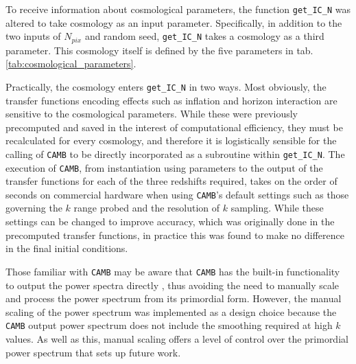 \documentclass[floats,floatfix,showpacs,amssymb,prd,superscriptaddress,nofootinbib]{revtex4-2} %
\newcommand{\code}{\texttt}
\newcommand{\red}{\textcolor{red}}
\begin{document}

To receive information about cosmological parameters, the function \code{get\_IC\_N} was altered to take cosmology as an input parameter. Specifically, in addition to the two inputs of $N_{pix}$ and random seed, \code{get\_IC\_N} takes a cosmology as a third parameter. This cosmology itself is defined by the five parameters in tab. \ref{tab:cosmological_parameters}.

Practically, the cosmology enters \code{get\_IC\_N} in two ways. Most obviously, the transfer functions encoding effects such as inflation and horizon interaction are sensitive to the cosmological parameters. While these were previously precomputed and saved in the interest of computational efficiency, they must be recalculated for every cosmology, and therefore it is logistically sensible for the calling of \code{CAMB} to be directly incorporated as a subroutine within \code{get\_IC\_N}. The execution of \code{CAMB}, from instantiation using parameters to the output of the transfer functions for each of the three redshifts required, takes on the order of seconds on commercial hardware when using \code{CAMB}'s default settings such as those governing the $k$ range probed and the resolution of $k$ sampling. While these settings can be changed to improve accuracy, which was originally done in the precomputed transfer functions, in practice this was found to make no difference in the final initial conditions. 

Those familiar with \code{CAMB} may be aware that \code{CAMB} has the built-in functionality to output the power spectra directly
, thus avoiding the need to manually scale and process the power spectrum from its primordial form. However, the manual scaling of the power spectrum was implemented as a design choice because the \code{CAMB} output power spectrum does not include the smoothing required at high $k$ values. As well as this, manual scaling offers a level of control over the primordial power spectrum that sets up future work.
\end{document}
